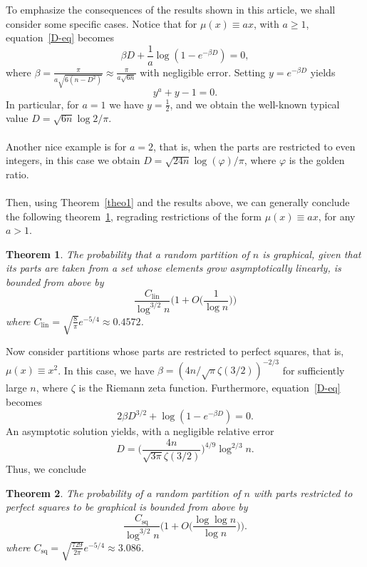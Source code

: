 \documentclass[pdflatex,sn-mathphys-num]{sn-jnl}%
\newtheorem{theorem}{Theorem}[section] %
\theoremstyle{thmstyleone}%
\theoremstyle{thmstyletwo}%
\theoremstyle{thmstylethree}%
\theoremstyle{thmstylethree}%
\theoremstyle{thmstylethree}%
\begin{document}
To emphasize the consequences of the results shown in this article, we shall consider some specific cases. Notice that for $\mu(x)\equiv ax$, with $a\ge1$, equation~\eqref{D-eq} becomes
\begin{equation*}
    \beta D + \frac{1}{a}\log(1-e^{-\beta D})=0,
\end{equation*}
where $\beta=\frac{\pi}{a\sqrt{6(n-D^2)}}\approx\frac{\pi}{a\sqrt{6n}}$ with negligible error. Setting $y=e^{-\beta D}$ yields
\begin{equation}
    y^a+y-1=0.
\end{equation}
In particular, for $a=1$ we have $y=\frac{1}{2}$, and we obtain the well-known typical value $D=\sqrt{6n}\log2/\pi$. \\
\\
Another nice example is for $a=2$, that is, when the parts are restricted to even integers, in this case we obtain $D=\sqrt{24n}\log(\varphi)/\pi$, where $\varphi$ is the golden ratio. \\
\\
Then, using Theorem~\ref{theo1} and the results above, we can generally conclude the following theorem~\ref{theo3}, regrading restrictions of the form $\mu(x)\equiv ax$, for any $a>1$.

\newpage

\begin{theorem}\label{theo3}
    The probability that a random partition of $n$ is graphical, given that its parts are taken from a set whose elements grow asymptotically linearly, is bounded from above by
\begin{equation}
    \frac{C_\mathrm{lin}}{\log^{3/2}n}\Big(1+O\Big(\frac{1}{\log n}\Big)\Big)
\end{equation}
where $C_\mathrm{lin}=\sqrt{\frac{8}{\pi}}e^{-5/4}\approx0.4572$.
\end{theorem}

Now consider partitions whose parts are restricted to perfect squares, that is, $\mu(x)\equiv x^2$. In this case, we have $\beta=(4n/\sqrt{\pi}\zeta(3/2))^{-2/3}$ for sufficiently large $n$, where $\zeta$ is the Riemann zeta function. Furthermore, equation~\eqref{D-eq} becomes
\begin{equation*}
    2\beta D^{3/2} + \log(1-e^{-\beta D})=0.
\end{equation*}
An asymptotic solution yields, with a negligible relative error
\begin{equation*}
    D=\Big(\frac{4n}{\sqrt{3\pi}\zeta(3/2)}\Big)^{4/9}\log^{2/3}n.
\end{equation*}
Thus, we conclude
\begin{theorem}\label{theo4}
    The probability of a random partition of $n$ with parts restricted to perfect squares to be graphical is bounded from above by
    \begin{equation}
    \frac{C_\mathrm{sq}}{\log^{3/2}n}\Big(1+O\Big(\frac{\log\log n}{\log n}\Big)\Big).
\end{equation}
where $C_\mathrm{sq}=\sqrt{\frac{729}{2\pi}}e^{-5/4}\approx3.086$.
\end{theorem}
\end{document}
